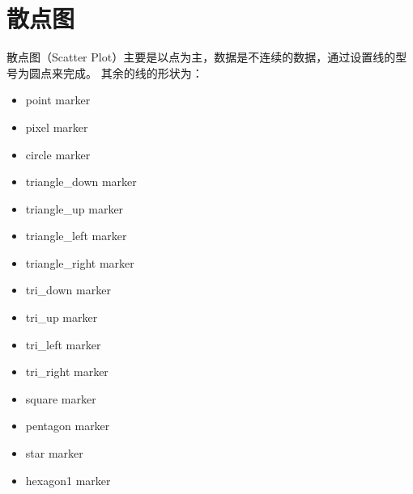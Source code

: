 \documentclass[letterpaper,10pt,english]{sphinxhowto}
\begin{document}
\section{散点图}
\label{\detokenize{_u6563_u70b9_u56fe:id1}}\label{\detokenize{_u6563_u70b9_u56fe::doc}}
散点图（Scatter Plot）主要是以点为主，数据是不连续的数据，通过设置线的型号为圆点来完成。
其余的线的形状为：
\begin{itemize}
\item {} 
          point marker

\item {} 
          pixel marker

\item {} 
          circle marker

\item {} 
          triangle\_down marker

\item {} 
          triangle\_up marker

\item {} 
          triangle\_left marker

\item {} 
          triangle\_right marker

\item {} 
          tri\_down marker

\item {} 
          tri\_up marker

\item {} 
          tri\_left marker

\item {} 
          tri\_right marker

\item {} 
          square marker

\item {} 
          pentagon marker

\item {} 
          star marker

\item {} 
          hexagon1 marker


\end{itemize}
\end{document}
